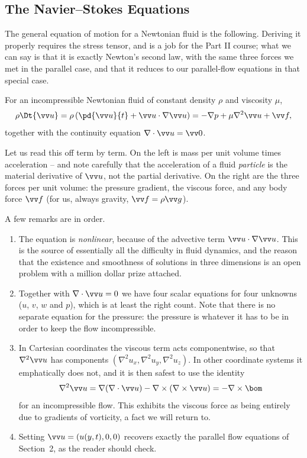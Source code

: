 \subsection{The Navier--Stokes Equations}

The general equation of motion for a Newtonian fluid is the following. Deriving it properly requires the stress tensor, and is a job for the Part II course; what we can say is that it is exactly Newton's second law, with the same three forces we met in the parallel case, and that it reduces to our parallel-flow equations in that special case.

\begin{law}
	For an incompressible Newtonian fluid of constant density $\rho$ and viscosity $\mu$,
	$$
	\rho \Dt{\vv u} = \rho\left(\pd{\vv u}{t} + \vv u \cdot \nabla \vv u\right) = -\nabla p + \mu \nabla^2 \vv u + \vv f,
	$$
	together with the continuity equation $\nabla \cdot \vv u = \vv 0$.
\end{law}

Let us read this off term by term. On the left is mass per unit volume times acceleration -- and note carefully that the acceleration of a fluid \emph{particle} is the material derivative of $\vv u$, not the partial derivative. On the right are the three forces per unit volume: the pressure gradient, the viscous force, and any body force $\vv f$ (for us, always gravity, $\vv f = \rho \vv g$).

A few remarks are in order.

\begin{enumerate}[label=(\roman*)]
	\item The equation is \emph{nonlinear}, because of the advective term $\vv u \cdot \nabla \vv u$. This is the source of essentially all the difficulty in fluid dynamics, and the reason that the existence and smoothness of solutions in three dimensions is an open problem with a million dollar prize attached.
	\item Together with $\nabla \cdot \vv u = 0$ we have four scalar equations for four unknowns ($u$, $v$, $w$ and $p$), which is at least the right count. Note that there is no separate equation for the pressure: the pressure is whatever it has to be in order to keep the flow incompressible.
	\item In Cartesian coordinates the viscous term acts componentwise, so that $\nabla^2 \vv u$ has components $(\nabla^2 u_x, \nabla^2 u_y, \nabla^2 u_z)$. In other coordinate systems it emphatically does not, and it is then safest to use the identity
	$$
	\nabla^2 \vv u = \nabla(\nabla \cdot \vv u) - \nabla \times (\nabla \times \vv u) = -\nabla \times \bom
	$$
	for an incompressible flow. This exhibits the viscous force as being entirely due to gradients of vorticity, a fact we will return to.
	\item Setting $\vv u = (u(y, t), 0, 0)$ recovers exactly the parallel flow equations of Section~2, as the reader should check.
\end{enumerate}

